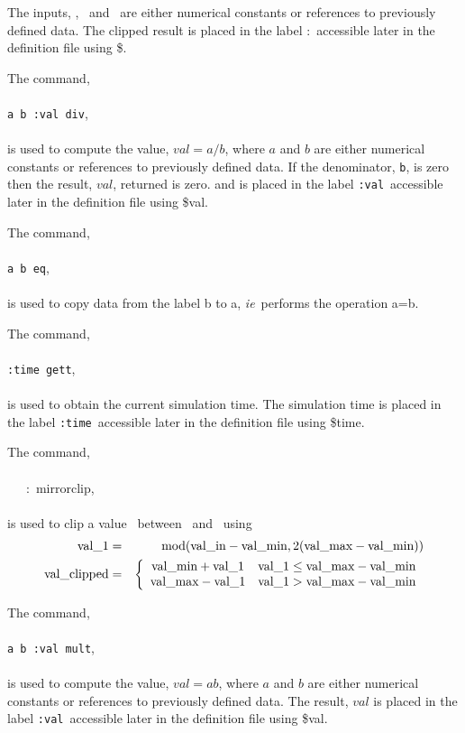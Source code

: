 \documentclass[11pt,twoside]{book}
\newcommand{\hitem}[1]{\item[{\bf #1} \hfill]}
\begin{document}
\noindent The inputs, \valin, \valmin\ and \valmax\ are either numerical constants or references to previously defined data.  The clipped result is placed in the label :\valclipped\ accessible later in the definition file using \$\valclipped.

\hitem{div}
The command, \\
\\
{\tt a b :val div}, \\
\\
is used to compute the value, $val=a/b$, where $a$ and $b$ are either numerical constants or references to previously defined data.  If the denominator, {\tt b}, is zero then the result, $val$, returned is zero. and is placed in the label {\tt :val}\ accessible later in the definition file using \$val.

\hitem{eq}
The command, \\
\\
{\tt a b eq}, \\
\\
is used to copy data from the label b to a, {\em ie}\ performs the operation a=b.

\hitem{gett}
The command, \\
\\
{\tt :time gett}, \\
\\
is used to obtain the current simulation time.  The simulation time is placed in the label {\tt :time}\ accessible later in the definition file using \$time.

\hitem{mirrorclip}
The command, \\
\\
\valin\ \valmin\ \valmax\ :\valclipped\ mirrorclip, \\
\\
is used to clip a value \valin\ between \valmin\
and \valmax\ using
\begin{eqnarray}
{\tt \mbox{val\_1}}&=&\mbox{mod}( {\tt \mbox{val\_in}}-{\tt \mbox{val\_min}},2({\tt \mbox{val\_max}}-{\tt \mbox{val\_min}}) )\\
{\tt \mbox{val\_clipped}}&=&\left\{
\begin{array}{cc}
  {\tt \mbox{val\_min}}+{\tt \mbox{val\_1}} & {\tt \mbox{val\_1}}\le {\tt \mbox{val\_max}}-{\tt \mbox{val\_min}} \\
  {\tt \mbox{val\_max}}-{\tt \mbox{val\_1}} & {\tt \mbox{val\_1}}> {\tt \mbox{val\_max}}-{\tt \mbox{val\_min}}
\end{array}
\right.
\end{eqnarray}

\hitem{mult}
The command, \\
\\
{\tt a b :val mult}, \\
\\
is used to compute the value, $val=ab$, where $a$ and $b$ are either numerical constants or references to previously defined data.  The result, $val$ is placed in the label {\tt :val}\ accessible later in the definition file using \$val.
\end{document}
